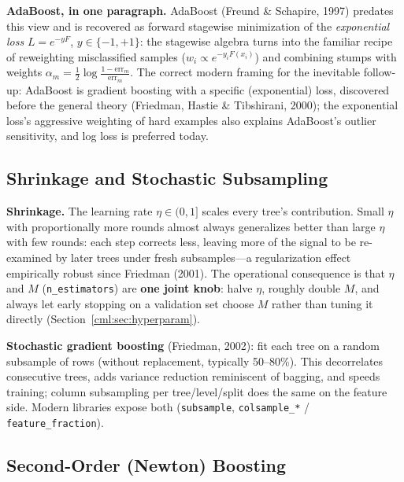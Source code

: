 \textbf{AdaBoost, in one paragraph.} AdaBoost (Freund \& Schapire, 1997) predates this view and is recovered as forward stagewise minimization of the \textit{exponential loss} $L = e^{-yF}$, $y \in \{-1,+1\}$: the stagewise algebra turns into the familiar recipe of reweighting misclassified samples ($w_i \propto e^{-y_i F(x_i)}$) and combining stumps with weights $\alpha_m = \tfrac{1}{2}\log\frac{1-\text{err}_m}{\text{err}_m}$. The correct modern framing for the inevitable follow-up: AdaBoost is gradient boosting with a specific (exponential) loss, discovered before the general theory (Friedman, Hastie \& Tibshirani, 2000); the exponential loss's aggressive weighting of hard examples also explains AdaBoost's outlier sensitivity, and log loss is preferred today.

\subsection{Shrinkage and Stochastic Subsampling}

\textbf{Shrinkage.} The learning rate $\eta \in (0, 1]$ scales every tree's contribution. Small $\eta$ with proportionally more rounds almost always generalizes better than large $\eta$ with few rounds: each step corrects less, leaving more of the signal to be re-examined by later trees under fresh subsamples---a regularization effect empirically robust since Friedman (2001). The operational consequence is that $\eta$ and $M$ (\texttt{n\_estimators}) are \textbf{one joint knob}: halve $\eta$, roughly double $M$, and always let early stopping on a validation set choose $M$ rather than tuning it directly (Section~\ref{cml:sec:hyperparam}).

\textbf{Stochastic gradient boosting} (Friedman, 2002): fit each tree on a random subsample of rows (without replacement, typically 50--80\%). This decorrelates consecutive trees, adds variance reduction reminiscent of bagging, and speeds training; column subsampling per tree/level/split does the same on the feature side. Modern libraries expose both (\texttt{subsample}, \texttt{colsample\_*} / \texttt{feature\_fraction}).

\subsection{Second-Order (Newton) Boosting}

